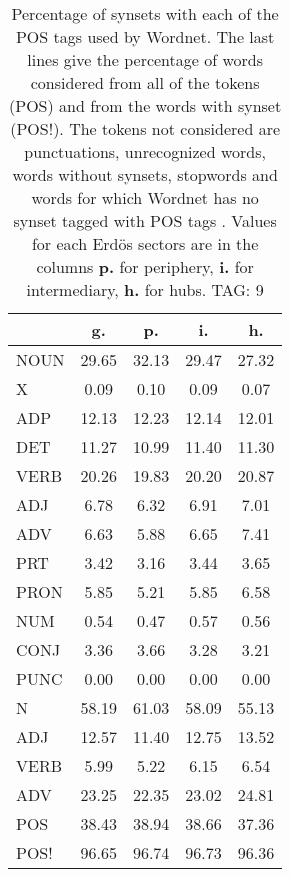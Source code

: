 \begin{table}[h!]
\begin{center}
\begin{tabular}{| l || c | c | c | c |}\hline
 & {\bf g.} & {\bf p.} & {\bf i.} & {\bf h.} \\\hline\hline
NOUN & 29.65  & 32.13  & 29.47  & 27.32 \\
X & 0.09  & 0.10  & 0.09  & 0.07 \\\hline
ADP & 12.13  & 12.23  & 12.14  & 12.01 \\
DET & 11.27  & 10.99  & 11.40  & 11.30 \\\hline
VERB & 20.26  & 19.83  & 20.20  & 20.87 \\\hline
ADJ & 6.78  & 6.32  & 6.91  & 7.01 \\
ADV & 6.63  & 5.88  & 6.65  & 7.41 \\\hline
PRT & 3.42  & 3.16  & 3.44  & 3.65 \\
PRON & 5.85  & 5.21  & 5.85  & 6.58 \\
NUM & 0.54  & 0.47  & 0.57  & 0.56 \\
CONJ & 3.36  & 3.66  & 3.28  & 3.21 \\
PUNC & 0.00  & 0.00  & 0.00  & 0.00 \\\hline\hline\hline
N & 58.19  & 61.03  & 58.09  & 55.13 \\\hline
ADJ & 12.57  & 11.40  & 12.75  & 13.52 \\\hline
VERB & 5.99  & 5.22  & 6.15  & 6.54 \\\hline
ADV & 23.25  & 22.35  & 23.02  & 24.81 \\\hline\hline
POS & 38.43  & 38.94  & 38.66  & 37.36 \\\hline
POS! & 96.65  & 96.74  & 96.73  & 96.36 \\\hline
\end{tabular}
\caption{Percentage of synsets with each of the POS tags used by Wordnet. The last lines give the percentage of words considered from all of the tokens (POS) and from the words with synset (POS!). The tokens not considered are punctuations, unrecognized words, words without synsets, stopwords and words for which Wordnet has no synset  tagged with POS tags . Values for each Erd\"os sectors are in the columns {{\bf p.}} for periphery, {{\bf i.}} for intermediary, {{\bf h.}} for hubs. TAG: 9}
\end{center}
\end{table}